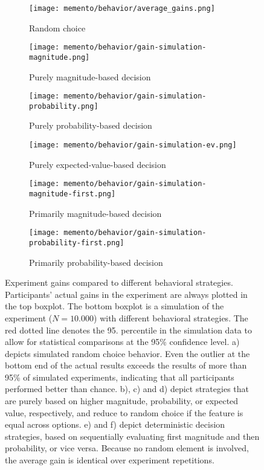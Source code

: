 \begin{figure}
	\begin{subfigure}{0.5\textwidth}
		\texttt{[image: memento/behavior/average\_gains.png]}
		\caption{Random choice}
		\label{fig:gains}
	\end{subfigure}
	\begin{subfigure}{0.5\textwidth}
		\texttt{[image: memento/behavior/gain-simulation-magnitude.png]}
		\caption{Purely magnitude-based decision}
		\label{fig:strategy-prob}
	\end{subfigure}
	\begin{subfigure}{0.5\textwidth}
		\texttt{[image: memento/behavior/gain-simulation-probability.png]}
		\caption{Purely probability-based decision}
		\label{fig:strategy-mag}
	\end{subfigure}
	\begin{subfigure}{0.5\textwidth}
		\texttt{[image: memento/behavior/gain-simulation-ev.png]}
		\caption{Purely expected-value-based decision}
		\label{fig:strategy-ev}
	\end{subfigure}
	\begin{subfigure}{0.5\textwidth}
		\texttt{[image: memento/behavior/gain-simulation-magnitude-first.png]}
		\caption{Primarily magnitude-based decision}
		\label{fig:strategy-mag-first}
	\end{subfigure}
	\begin{subfigure}{0.5\textwidth}
		\texttt{[image: memento/behavior/gain-simulation-probability-first.png]}
		\caption{Primarily probability-based decision}
		\label{fig:strategy-prob-first}
	\end{subfigure}
	\caption[Experiment gains compared to different behavioral strategies]{Experiment gains compared to different behavioral strategies. Participants' actual gains in the experiment are always plotted in the top boxplot. The bottom boxplot is a simulation of the experiment ($N=10.000$) with different behavioral strategies. The red dotted line denotes the 95. percentile in the simulation data to allow for statistical comparisons at the 95\% confidence level. a) depicts simulated random choice behavior. Even the outlier at the bottom end of the actual results exceeds the results of more than 95\% of simulated experiments, indicating that all participants performed better than chance. b), c) and d) depict strategies that are purely based on higher magnitude, probability, or expected value, respectively, and reduce to random choice if the feature is equal across options. e) and f) depict deterministic decision strategies, based on sequentially evaluating first magnitude and then probability, or vice versa. Because no random element is involved, the average gain is identical over experiment repetitions.}
\end{figure}

